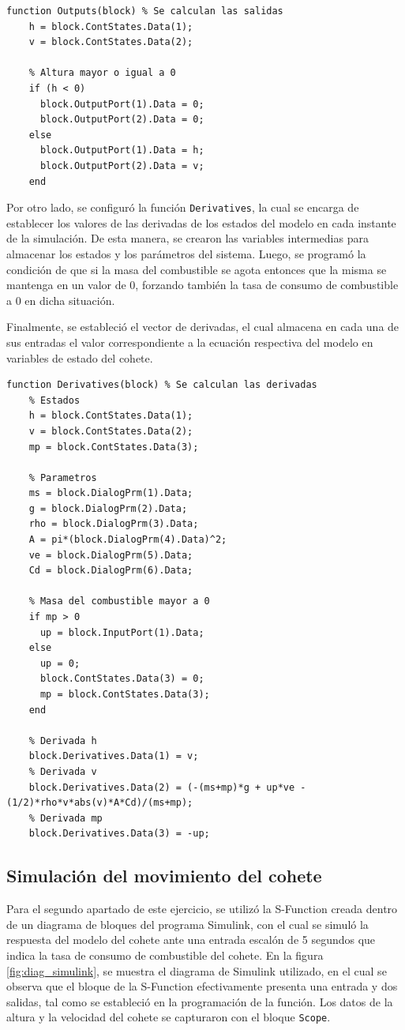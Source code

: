 \documentclass[12pt,letterpaper]{article}
\begin{document}
\begin{lstlisting}[style=Matlab-editor, basicstyle=\mlttfamily]
  function Outputs(block) % Se calculan las salidas
    h = block.ContStates.Data(1);
    v = block.ContStates.Data(2);

    % Altura mayor o igual a 0
    if (h < 0)
      block.OutputPort(1).Data = 0;
      block.OutputPort(2).Data = 0;
    else
      block.OutputPort(1).Data = h;
      block.OutputPort(2).Data = v;
    end
\end{lstlisting}

Por otro lado, se configuró la función \texttt{Derivatives}, la cual se encarga de establecer los
valores de las derivadas de los estados del modelo en cada instante de la simulación. De esta
manera, se crearon las variables intermedias para almacenar los estados y los parámetros
del sistema. Luego, se programó la condición de que si la masa del combustible se agota entonces que
la misma se mantenga en un valor de 0, forzando también la tasa de consumo de combustible a 0 en
dicha situación.

Finalmente, se estableció el vector de derivadas, el cual almacena en cada una de sus entradas el
valor correspondiente a la ecuación respectiva del modelo en variables de estado del cohete.

\begin{lstlisting}[style=Matlab-editor, basicstyle=\mlttfamily]
  function Derivatives(block) % Se calculan las derivadas
    % Estados
    h = block.ContStates.Data(1);
    v = block.ContStates.Data(2);
    mp = block.ContStates.Data(3);

    % Parametros
    ms = block.DialogPrm(1).Data;
    g = block.DialogPrm(2).Data;
    rho = block.DialogPrm(3).Data;
    A = pi*(block.DialogPrm(4).Data)^2;
    ve = block.DialogPrm(5).Data;
    Cd = block.DialogPrm(6).Data;

    % Masa del combustible mayor a 0
    if mp > 0
      up = block.InputPort(1).Data;
    else
      up = 0;
      block.ContStates.Data(3) = 0;
      mp = block.ContStates.Data(3);
    end

    % Derivada h
    block.Derivatives.Data(1) = v;
    % Derivada v
    block.Derivatives.Data(2) = (-(ms+mp)*g + up*ve -(1/2)*rho*v*abs(v)*A*Cd)/(ms+mp);
    % Derivada mp
    block.Derivatives.Data(3) = -up;     
\end{lstlisting}


\subsection{Simulación del movimiento del cohete}
Para el segundo apartado de este ejercicio, se utilizó la S-Function creada dentro de un diagrama de
bloques del programa Simulink, con el cual se simuló la respuesta del modelo del cohete ante una
entrada escalón de 5 segundos que indica la tasa de consumo de combustible del cohete. En la figura
\ref{fig:diag_simulink}, se muestra el diagrama de Simulink utilizado, en el cual se observa que el
bloque de la S-Function efectivamente presenta una entrada y dos salidas, tal como se estableció en
la programación de la función. Los datos de la altura y la velocidad del cohete se capturaron con el
bloque \texttt{Scope}.
\end{document}
